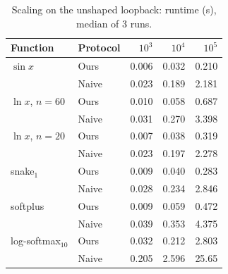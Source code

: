 \begin{table}[t]\centering\small
\caption{Scaling on the unshaped loopback: runtime (s), median of 3 runs.}
\label{tab:scaling}
\setlength{\tabcolsep}{4pt}
\begin{tabular}{llrrr}\toprule
Function & Protocol & $10^{3}$ & $10^{4}$ & $10^{5}$\\\midrule
$\sin x$ & \textsf{Ours} & 0.006 & 0.032 & 0.210\\
 & \textsf{Naive} & 0.023 & 0.189 & 2.181\\
$\ln x$, $n{=}60$ & \textsf{Ours} & 0.010 & 0.058 & 0.687\\
 & \textsf{Naive} & 0.031 & 0.270 & 3.398\\
$\ln x$, $n{=}20$ & \textsf{Ours} & 0.007 & 0.038 & 0.319\\
 & \textsf{Naive} & 0.023 & 0.197 & 2.278\\
snake$_1$ & \textsf{Ours} & 0.009 & 0.040 & 0.283\\
 & \textsf{Naive} & 0.028 & 0.234 & 2.846\\
softplus & \textsf{Ours} & 0.009 & 0.059 & 0.472\\
 & \textsf{Naive} & 0.039 & 0.353 & 4.375\\
log-softmax$_{10}$ & \textsf{Ours} & 0.032 & 0.212 & 2.803\\
 & \textsf{Naive} & 0.205 & 2.596 & 25.65\\
\bottomrule\end{tabular}
\end{table}
